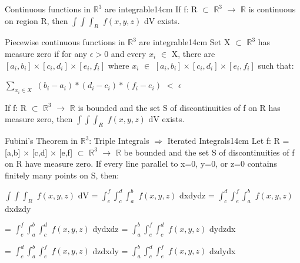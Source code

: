     \vspace{0.5cm}



    \begin{wtheorem}{Continuous functions in $\mathbb{R}^3$ are integrable}{14cm}
        If f: R $\subset$ $\mathbb{R}^3$ $\rightarrow$ $\mathbb{R}$
        is continuous on region R, then $\int \int \int_R$ $f(x,y,z)$ dV exists.
    \end{wtheorem}

    \vspace{0.5cm}



    \begin{wtheorem}{Piecewise continuous functions in $\mathbb{R}^3$
    are integrable}{14cm}
        Set X $\subset$ $\mathbb{R}^3$ has measure zero
        if for any $\epsilon > 0$ and every $x_i$ $\in$ X, there are
        $[a_i,b_i] \times [c_i,d_i] \times [e_i,f_i]$ where $x_i$ $\in$
        $[a_i,b_i] \times [c_i,d_i] \times [e_i,f_i]$ such that:

        \hspace{0.5cm}
        $\sum_{x_i \in X}$ $(b_i - a_i)*(d_i - c_i)*(f_i - e_i)$ $<$ $\epsilon$

        \vspace{0.3cm}
        
        If f: R $\subset$ $\mathbb{R}^3$ $\rightarrow$ $\mathbb{R}$
        is bounded and the set S of discontinuities of f on R
        has measure zero, then $\int \int \int_R$ $f(x,y,z)$ dV exists.
    \end{wtheorem}

    \vspace{0.5cm}



    \begin{wtheorem}{Fubini's Theorem in $\mathbb{R}^3$:
    Triple Integrals $\Rightarrow$ Iterated Integrals}{14cm}
        Let f: R = [a,b] $\times$ [c,d] $\times$ [e,f] $\subset$ $\mathbb{R}^3$
        $\rightarrow$ $\mathbb{R}$ be bounded and the set S of
        discontinuities of f on R have measure zero.
        If every line parallel to x=0, y=0, or z=0 contains finitely
        many points on S, then:

        \hspace{0.2cm}
        $\int \int \int_R$ $f(x,y,z)$ dV
        = $\int_e^f \int_c^d \int_a^b$ $f(x,y,z)$ dxdydz
        = $\int_c^d \int_e^f \int_a^b$ $f(x,y,z)$ dxdzdy
        
        \hspace{3.75cm}
        = $\int_e^f \int_a^b \int_c^d$ $f(x,y,z)$ dydxdz
        = $\int_a^b \int_e^f \int_c^d$ $f(x,y,z)$ dydzdx

        \hspace{3.75cm}
        = $\int_c^d \int_a^b \int_e^f$ $f(x,y,z)$ dzdxdy
        = $\int_a^b \int_c^d \int_e^f$ $f(x,y,z)$ dzdydx
    \end{wtheorem}

